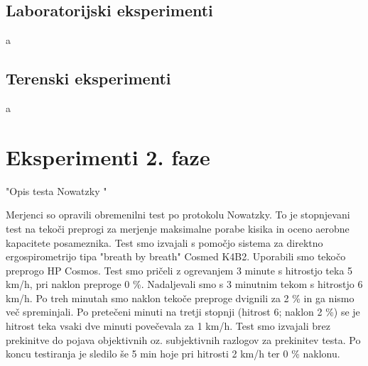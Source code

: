 

\subsection{Laboratorijski eksperimenti}
a

\subsection{Terenski eksperimenti}
a

\section{Eksperimenti 2. faze}
"Opis testa Nowatzky "

Merjenci  so opravili obremenilni test po protokolu Nowatzky. To je stopnjevani test na tekoči preprogi za merjenje maksimalne porabe kisika in oceno aerobne kapacitete  posameznika. Test smo izvajali s pomočjo sistema za direktno ergospirometrijo tipa "breath  by breath" Cosmed K4B2. Uporabili smo  tekočo  preprogo HP Cosmos. Test smo pričeli z ogrevanjem 3 minute s hitrostjo teka 5 km/h, pri naklon preproge 0 \%. Nadaljevali smo s 3 minutnim tekom s hitrostjo 6 km/h. Po treh minutah smo naklon tekoče preproge  dvignili za 2 \% in ga nismo več spreminjali. Po pretečeni minuti na  tretji stopnji (hitrost 6; naklon 2 \%) se je hitrost teka vsaki dve  minuti  povečevala za 1 km/h. Test smo izvajali brez prekinitve do pojava objektivnih oz. subjektivnih razlogov za prekinitev testa. Po koncu testiranja je sledilo še 5 min hoje pri  hitrosti 2 km/h ter 0 \% naklonu.  


